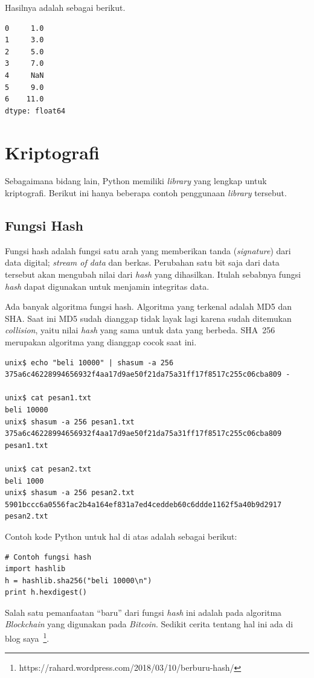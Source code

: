 Hasilnya adalah sebagai berikut.
\begin{verbatim}
0     1.0
1     3.0
2     5.0
3     7.0
4     NaN
5     9.0
6    11.0
dtype: float64
\end{verbatim}


\section{Kriptografi}
Sebagaimana bidang lain, Python memiliki {\em library} yang lengkap untuk
kriptografi. Berikut ini hanya beberapa contoh penggunaan {\em library}
tersebut.

\subsection{Fungsi Hash}
Fungsi hash adalah fungsi satu arah yang memberikan tanda ({\em signature})
dari data digital; {\em stream of data} dan berkas.
Perubahan satu bit saja dari data tersebut akan mengubah nilai dari
{\em hash} yang dihasilkan. Itulah sebabnya fungsi {\em hash} dapat
digunakan untuk menjamin integritas data.

Ada banyak algoritma fungsi hash. Algoritma yang terkenal adalah MD5
dan SHA. Saat ini MD5 sudah dianggap tidak layak lagi karena sudah
ditemukan {\em collision}, yaitu nilai {\em hash} yang sama untuk data
yang berbeda. SHA~256 merupakan algoritma yang dianggap cocok saat ini.

\begin{verbatim}
unix$ echo "beli 10000" | shasum -a 256
375a6c46228994656932f4aa17d9ae50f21da75a31ff17f8517c255c06cba809 -

unix$ cat pesan1.txt
beli 10000
unix$ shasum -a 256 pesan1.txt
375a6c46228994656932f4aa17d9ae50f21da75a31ff17f8517c255c06cba809 pesan1.txt

unix$ cat pesan2.txt
beli 1000
unix$ shasum -a 256 pesan2.txt
5901bccc6a0556fac2b4a164ef831a7ed4ceddeb60c6ddde1162f5a40b9d2917 pesan2.txt
\end{verbatim}

Contoh kode Python untuk hal di atas adalah sebagai berikut:

\begin{verbatim}
# Contoh fungsi hash
import hashlib
h = hashlib.sha256("beli 10000\n")
print h.hexdigest()
\end{verbatim}


Salah satu pemanfaatan ``baru'' dari fungsi {\em hash} ini adalah pada
algoritma {\em Blockchain} yang digunakan pada {\em Bitcoin}. Sedikit
cerita tentang hal ini ada di blog
saya~\footnote{https://rahard.wordpress.com/2018/03/10/berburu-hash/}.
